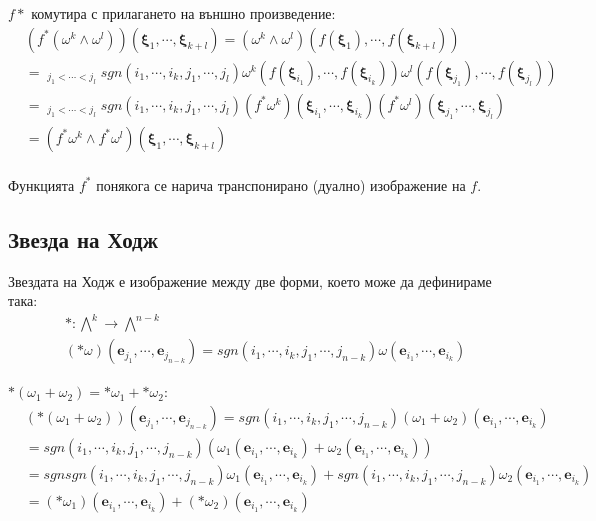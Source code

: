 \documentclass[12pt]{article}
\newcommand\func[3]{#1:#2 \to #3}
\newcommand\myxi[0]{\boldsymbol{\xi}}
\begin{document}
\begin{large}
$f*$ комутира с прилагането на външно произведение:
\begin{align*}
  &(f^*(\omega^k \wedge \omega^l))(\myxi_1,\cdots,\myxi_{k+l})=(\omega^k \wedge \omega^l)(f(\myxi_1),\cdots,f(\myxi_{k+l})) \\
  &=\mathop{\sum_{i_1<\cdots<i_k}}_{j_1<\cdots<j_l}sgn(i_1,\cdots,i_k,j_1, \cdots,j_l) \omega^k(f(\myxi_{i_1}),\cdots,f(\myxi_{i_k})) \omega^l(f(\myxi_{j_1}),\cdots,f(\myxi_{j_l})) \\
  &=\mathop{\sum_{i_1<\cdots<i_k}}_{j_1<\cdots<j_l}sgn(i_1,\cdots,i_k,j_1, \cdots,j_l) (f^* \omega^k)(\myxi_{i_1},\cdots,\myxi_{i_k}) (f^*\omega^l)(\myxi_{j_1},\cdots,\myxi_{j_l}) \\
  &=(f^* \omega^k \wedge f^*\omega^l)(\myxi_1,\cdots, \myxi_{k+l})\\
\end{align*}

\begin{comment}
&(\lambda (f^* \omega^k))(\myxi_1,\cdots,\myxi_k)=(\lambda \omega^k)(f(\myxi_1),\cdots, f(\myxi_k))=
\lambda (f^* \omega^k)(\myxi_1,\cdots,\myxi_k)
\end{comment}

Функцията $f^*$ понякога се нарича транспонирано (дуално) изображение на $f$.

\subsection{Звезда на Ходж}
Звездата на Ходж е изображение между две форми, което може да дефинираме така:
\begin{align*}
  &\func{\ast}{{\bigwedge}^k}{{\bigwedge}^{n-k}} \\
  &(\ast \omega) (\mathbf{e}_{j_1},\cdots, \mathbf{e}_{j_{n-k}})=sgn(i_1,\cdots,i_k,j_1,\cdots,j_{n-k})\omega(\mathbf{e}_{i_1},\cdots,\mathbf{e}_{i_k})
\end{align*}

$\ast (\omega_1+\omega_2) = \ast\omega_1+ \ast \omega_2$:
\begin{align*}
  &(\ast (\omega_1+\omega_2))(\mathbf{e}_{j_1},\cdots, \mathbf{e}_{j_{n-k}})=sgn(i_1,\cdots,i_k,j_1,\cdots,j_{n-k})(\omega_1+\omega_2)(\mathbf{e}_{i_1},\cdots,\mathbf{e}_{i_k}) \\
  &=sgn(i_1,\cdots,i_k,j_1,\cdots,j_{n-k})(\omega_1(\mathbf{e}_{i_1},\cdots,\mathbf{e}_{i_k})+\omega_2(\mathbf{e}_{i_1},\cdots,\mathbf{e}_{i_k})) \\
  &=sgnsgn(i_1,\cdots,i_k,j_1,\cdots,j_{n-k})\omega_1(\mathbf{e}_{i_1},\cdots,\mathbf{e}_{i_k}) + sgn(i_1,\cdots,i_k,j_1,\cdots,j_{n-k})\omega_2(\mathbf{e}_{i_1},\cdots,\mathbf{e}_{i_k}) \\
  &=(\ast\omega_1)(\mathbf{e}_{i_1},\cdots,\mathbf{e}_{i_k})+(\ast\omega_2)(\mathbf{e}_{i_1},\cdots,\mathbf{e}_{i_k})
\end{align*}


\end{large}
\end{document}

